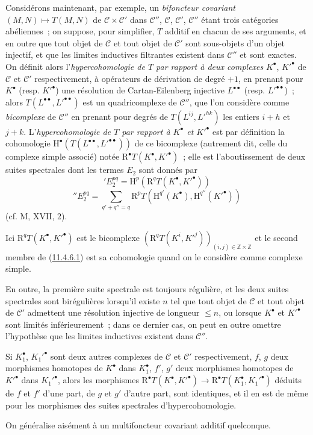 \begin{env}[11.4.6]
\label{0.11.4.6-fr}
Considérons maintenant, par exemple, un \emph{bifoncteur covariant}
$(M,N)\mapsto T(M,N)$ de $\mathcal C\times\mathcal C'$ dans $\mathcal C''$,
$\mathcal C$, $\mathcal C'$, $\mathcal C''$ étant trois catégories
abéliennes~; on suppose, pour simplifier, $T$ additif en chacun de ses
arguments, et en outre que tout objet de $\mathcal C$ et tout objet de
$\mathcal C'$ sont sous-objets d'un objet injectif, et que les limites
inductives filtrantes existent dans $\mathcal C''$ et sont exactes. On définit
alors l'\emph{hypercohomologie de $T$ par rapport à deux complexes}
$K^\bullet$, $K'^\bullet$ de $\mathcal C$ et $\mathcal C'$ respectivement, à
opérateurs de dérivation de degré $+1$, en prenant pour $K^\bullet$ (resp.
$K'^\bullet$) une résolution de Cartan-Eilenberg injective
$L^{\bullet\bullet}$ (resp. $L'^{\bullet\bullet}$)~; alors
$T(L^{\bullet\bullet},L'^{\bullet\bullet})$ est un quadricomplexe de
$\mathcal C''$, que l'on considère comme \emph{bicomplexe} de $\mathcal C''$
en prenant pour degrés de $T(L^{ij},L'^{hk})$ les entiers $i+h$ et $j+k$.
L'\emph{hypercohomologie de $T$ par rapport à $K^\bullet$ et $K'^\bullet$}
est par définition la cohomologie
$\mathrm H^\bullet(T(L^{\bullet\bullet},L'^{\bullet\bullet}))$ de ce
bicomplexe (autrement dit, celle du complexe simple associé) notée
$\mathrm R^\bullet T(K^\bullet,K'^\bullet)$~; elle est l'aboutissement de
deux suites spectrales dont les termes $E_2$ sont donnés par
\[
  \label{0.11.4.6.1-fr}
  'E_2^{pq}=\mathrm H^p(\mathrm R^qT(K^\bullet,K'^\bullet))
  \tag{11.4.6.1}
\]
\[
  \label{0.11.4.6.2-fr}
  ''E_2^{pq}=\sum_{q'+q''=q}
  \mathrm R^pT(\mathrm H^{q'}(K^\bullet),\mathrm H^{q''}(K'^\bullet))
  \tag{11.4.6.2}
\]
(cf. M, XVII, 2).

Ici $\mathrm R^qT(K^\bullet,K'^\bullet)$ est le bicomplexe
$(\mathrm R^qT(K^i,K'^j))_{(i,j)\in\mathbb Z\times\mathbb Z}$ et le second
membre de (\hyperref[0.11.4.6.1-fr]{11.4.6.1}) est sa cohomologie quand on le
considère comme complexe simple.

En outre, la première suite spectrale est toujours régulière, et les deux
suites spectrales sont birégulières lorsqu'il existe $n$ tel que tout objet de
$\mathcal C$ et tout objet de $\mathcal C'$ admettent une résolution injective
de longueur $\leq n$, ou lorsque $K^\bullet$ et $K'^\bullet$ sont limités
inférieurement~; dans ce dernier cas, on peut en outre omettre l'hypothèse que
les limites inductives existent dans $\mathcal C''$.

Si $K_1^\bullet$, $K_1'^\bullet$ sont deux autres complexes de $\mathcal C$ et
$\mathcal C'$ respectivement, $f$, $g$ deux morphismes homotopes de
$K^\bullet$ dans $K_1^\bullet$, $f'$, $g'$ deux morphismes homotopes de
$K'^\bullet$ dans $K_1'^\bullet$, alors les morphismes
$\mathrm R^\bullet T(K^\bullet,K'^\bullet)\to
\mathrm R^\bullet T(K_1^\bullet,K_1'^\bullet)$ déduits de $f$ et $f'$ d'une
part, de $g$ et $g'$ d'autre part, sont identiques, et il en est de même pour
les morphismes des suites spectrales d'hypercohomologie.

On généralise aisément à un multifoncteur covariant additif quelconque.
\end{env}


